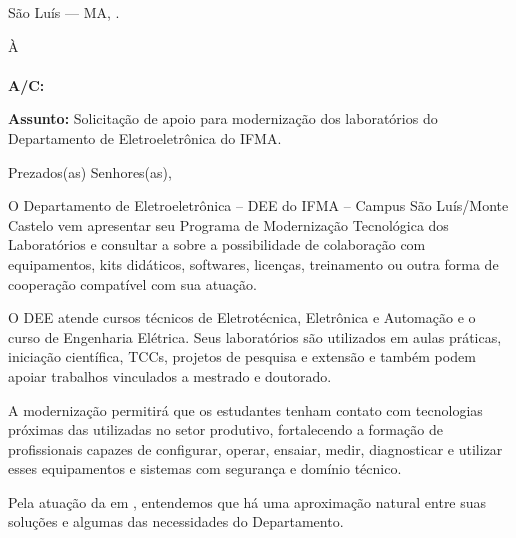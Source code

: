 
\selecionaContatoPeloArquivo


\cabecalhoInstitucional


\vspace{1.5mm}
\begin{flushright}
São Luís — MA, .
\end{flushright}

\vspace{4mm}
\noindent À\\
\textbf{\empresa}\\
\textbf{A/C:} \contatoPrioritario

\vspace{5mm}
\noindent\textbf{Assunto:} Solicitação de apoio para modernização dos laboratórios do Departamento de Eletroeletrônica do IFMA.

\vspace{4mm}
Prezados(as) Senhores(as),

O Departamento de Eletroeletrônica -- DEE do IFMA -- Campus São Luís/Monte Castelo vem apresentar seu Programa de Modernização Tecnológica dos Laboratórios e consultar a \textbf{\empresa} sobre a possibilidade de colaboração com equipamentos, kits didáticos, softwares, licenças, treinamento ou outra forma de cooperação compatível com sua atuação.

O DEE atende cursos técnicos de Eletrotécnica, Eletrônica e Automação e o curso de Engenharia Elétrica. Seus laboratórios são utilizados em aulas práticas, iniciação científica, TCCs, projetos de pesquisa e extensão e também podem apoiar trabalhos vinculados a mestrado e doutorado.

A modernização permitirá que os estudantes tenham contato com tecnologias próximas das utilizadas no setor produtivo, fortalecendo a formação de profissionais capazes de configurar, operar, ensaiar, medir, diagnosticar e utilizar esses equipamentos e sistemas com segurança e domínio técnico.

Pela atuação da \textbf{\empresa} em \areaEmpresa, entendemos que há uma aproximação natural entre suas soluções e algumas das necessidades do Departamento. \textoCooperacao

\vspace{2mm}
\vspace{1.5mm}

